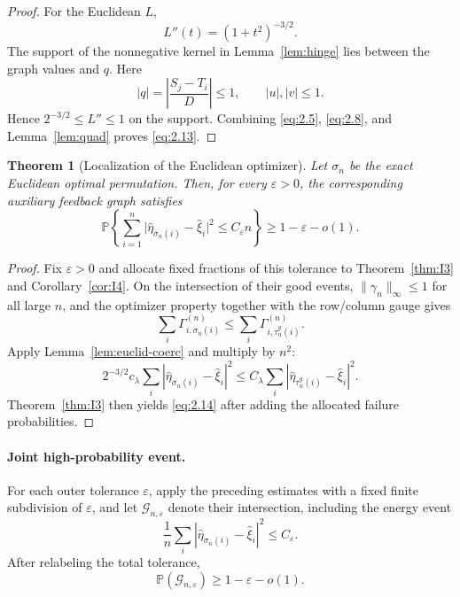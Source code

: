\documentclass[11pt,reqno]{amsart}
\newtheorem{theorem}{Theorem}[section]
\theoremstyle{definition}
\theoremstyle{remark}
\numberwithin{equation}{section}
\newcommand{\Pp}{\mathbb P}
\begin{document}
\begin{proof}
For the Euclidean \(L\),
\[
L''(t)=(1+t^2)^{-3/2}.
\]
The support of the nonnegative kernel in Lemma~\ref{lem:hinge} lies
between the graph values and \(q\).  Here
\[
|q|=\left|\frac{S_j-T_i}{D}\right|\le1,
\qquad
|u|,|v|\le1.
\]
Hence \(2^{-3/2}\le L''\le1\) on the support.  Combining
\eqref{eq:2.5}, \eqref{eq:2.8}, and Lemma~\ref{lem:quad} proves \eqref{eq:2.13}.
\end{proof}

\begin{theorem}[Localization of the Euclidean optimizer]
\label{thm:fgl2}
Let \(\sigma_n\) be the exact Euclidean optimal permutation.  Then, for every \(\varepsilon>0\), the corresponding auxiliary
feedback graph satisfies
\begin{equation}
\boxed{
\Pp\left\{
\sum_{i=1}^n
\bigl|\widehat\eta_{\sigma_n(i)}-\widehat\xi_i\bigr|^2
\le C_\varepsilon n
\right\}
\ge1-\varepsilon-o(1).
}
\label{eq:2.14}
\end{equation}
\end{theorem}

\begin{proof}
Fix \(\varepsilon>0\) and allocate fixed fractions of this tolerance to
Theorem~\ref{thm:I3} and Corollary~\ref{cor:I4}.  On the intersection
of their good events,
\(\|\gamma_n\|_\infty\le1\) for all large \(n\), and the optimizer
property together with the row/column gauge gives
\[
\sum_i\Gamma^{(n)}_{i,\sigma_n(i)}
\le
\sum_i\Gamma^{(n)}_{i,\tau_n^g(i)}.
\]
Apply Lemma~\ref{lem:euclid-coerc} and multiply by \(n^2\):
\[
2^{-3/2}c_\lambda
\sum_i|\widehat\eta_{\sigma_n(i)}-\widehat\xi_i|^2
\le
C_\lambda
\sum_i|\widehat\eta_{\tau_n^g(i)}-\widehat\xi_i|^2.
\]
Theorem~\ref{thm:I3} then yields \eqref{eq:2.14} after adding the allocated
failure probabilities.

\end{proof}

\paragraph{Joint high-probability event.}
For each outer tolerance \(\varepsilon\), apply the preceding
estimates with a fixed finite subdivision of \(\varepsilon\), and let
\(\mathcal G_{n,\varepsilon}\) denote their intersection, including the
energy event
\begin{equation}
\frac1n\sum_i
|\widehat\eta_{\sigma_n(i)}-\widehat\xi_i|^2\le C_\varepsilon.
\label{eq:2.17}
\end{equation}
After relabeling the total tolerance,
\begin{equation}
\Pp(\mathcal G_{n,\varepsilon})\ge1-\varepsilon-o(1).
\label{eq:2.18}
\end{equation}
\end{document}
